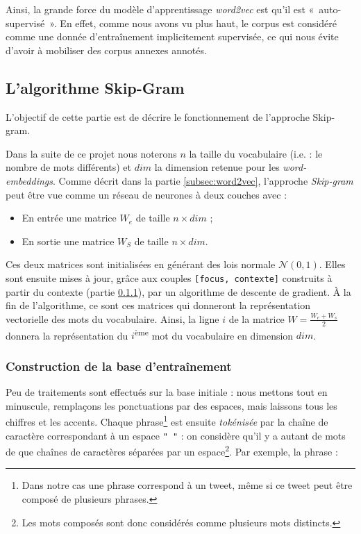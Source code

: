 \documentclass[11pt,french,french]{article}
\let\rmarkdownfootnote\footnote%
\def\footnote{\protect\rmarkdownfootnote}
\begin{document}
Ainsi, la grande force du modèle d'apprentissage \emph{word2vec} est qu'il est «~auto-supervisé~». En effet, comme nous avons vu plus haut, le corpus est considéré comme une donnée d'entraînement implicitement supervisée, ce qui nous évite d'avoir à mobiliser des corpus annexes annotés.

\hypertarget{sec:skipgram}{%
\subsection{L'algorithme Skip-Gram}\label{sec:skipgram}}

L'objectif de cette partie est de décrire le fonctionnement de l'approche Skip-gram.

Dans la suite de ce projet nous noterons \(n\) la taille du vocabulaire (i.e. : le nombre de mots différents) et \(dim\) la dimension retenue pour les \emph{word-embeddings}.
Comme décrit dans la partie \ref{subsec:word2vec}, l'approche \emph{Skip-gram} peut être vue comme un réseau de neurones à deux couches avec :

\begin{itemize}
\item
  En entrée une matrice \(W_e\) de taille \(n\times dim\) ;
\item
  En sortie une matrice \(W_S\) de taille \(n\times dim\).
\end{itemize}

Ces deux matrices sont initialisées en générant des lois normale \(\mathcal N(0,1)\). Elles sont ensuite mises à jour, grâce aux couples \texttt{{[}focus,\ contexte{]}} construits à partir du contexte (partie \ref{subsec:baseentrainement}), par un algorithme de descente de gradient.
À la fin de l'algorithme, ce sont ces matrices qui donneront la représentation vectorielle des mots du vocabulaire.
Ainsi, la ligne \(i\) de la matrice \(W=\frac{W_e+W_s}{2}\) donnera la représentation du \(i\)\textsuperscript{ème} mot du vocabulaire en dimension \(dim\).

\hypertarget{subsec:baseentrainement}{%
\subsubsection{Construction de la base d'entraînement}\label{subsec:baseentrainement}}

Peu de traitements sont effectués sur la base initiale : nous mettons tout en minuscule, remplaçons les ponctuations par des espaces, mais laissons tous les chiffres et les accents.
Chaque phrase\footnote{Dans notre cas une phrase correspond à un tweet, même si ce tweet peut être composé de plusieurs phrases.}
est ensuite \emph{tokénisée} par la chaîne de caractère correspondant à un espace \texttt{"\ "} : on considère qu'il y a autant de mots de que chaînes de caractères séparées par un espace\footnote{Les mots composés sont donc considérés comme plusieurs mots distincts.}. Par exemple, la phrase :
\end{document}
